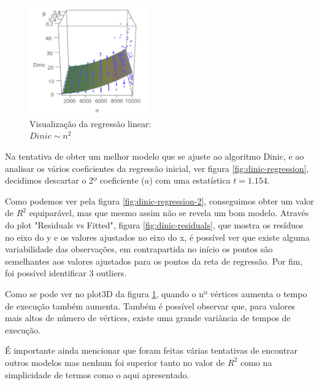 \documentclass{uofa-eng-assignment}
\begin{document}
\begin{figure}
\centering
\includegraphics[width=0.45\textwidth]{dinic_n^2_plot_lm.png}
\captionsetup{justification=centering}
\caption{Visualização da regressão linear: \\$Dinic \sim n^2$}
\label{fig:plot3d-dinic}
\end{figure}

Na tentativa de obter um melhor modelo que se ajuste ao algoritmo Dinic, e ao analisar os vários coeficientes da regressão inicial, ver figura \ref{fig:dinic-regression}, decidimos descartar o 2º coeficiente ($a$) com uma estatística $t = 1.154$.

Como podemos ver pela figura \ref{fig:dinic-regression-2}, conseguimos obter um valor de $R^2$ equiparável, mas que mesmo assim não se revela um bom modelo.
Através do plot "Residuals vs Fitted", figura \ref{fig:dinic-residuals}, que mostra os resíduos no eixo do y e os valores ajustados no eixo do x, é possível ver que existe alguma variabilidade das observações, em contrapartida no início os pontos são semelhantes aos valores ajustados para os pontos da reta de regressão. Por fim, foi possível identificar 3 outliers.

Como se pode ver no plot3D da figura \ref{fig:plot3d-dinic}, quando o nº vértices aumenta o tempo de execução também aumenta. Também é possível observar que, para valores mais altos de número de vértices, existe uma grande variância de tempos de execução.

É importante ainda mencionar que foram feitas várias tentativas de encontrar outros modelos mas nenhum foi superior tanto no valor de $R^2$ como na simplicidade de termos como o aqui apresentado.
\end{document}
